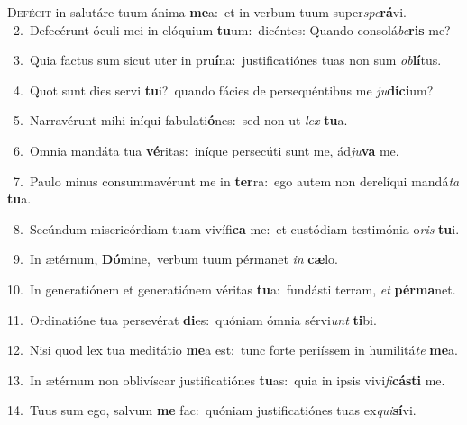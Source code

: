 \lettrine{\initial\textcolor{\initialcolor}{D}}{efécit} in salutáre tuum ánima \textbf{me}\-a:~\star et in verbum tuum super\-\textit{spe}\-\textbf{rá}vi.\\
{\numbfont\textcolor{\numbcolor}{~2.}}~Defecérunt óculi mei in elóquium \textbf{tu}\-um:~\star dicéntes: Quando consolá\-\textit{be}\-\textbf{ris} me?\par
{\numbfont\textcolor{\numbcolor}{~3.}}~Quia factus sum sicut uter in pru\-\textbf{í}\-na:~\star justificatiónes tuas non sum \textit{ob}\-\textbf{lí}tus.\par
{\numbfont\textcolor{\numbcolor}{~4.}}~Quot sunt dies servi \textbf{tu}\-i?~\star quando fácies de persequéntibus me \textit{ju}\-\textbf{dí}\textbf{ci}um?\par
{\numbfont\textcolor{\numbcolor}{~5.}}~Narravérunt mihi iníqui fabulati\-\textbf{ó}\-nes:~\star sed non ut \textit{lex} \textbf{tu}\-a.\par
{\numbfont\textcolor{\numbcolor}{~6.}}~Omnia mandáta tua \textbf{vé}\-ritas:~\star iníque persecúti sunt me, ád\-\textit{ju}\-\textbf{va} me.\par
{\numbfont\textcolor{\numbcolor}{~7.}}~Paulo minus consummavérunt me in \textbf{ter}\-ra:~\star ego autem non derelíqui mandá\textit{ta} \textbf{tu}\-a.\par
{\numbfont\textcolor{\numbcolor}{~8.}}~Secúndum misericórdiam tuam vivífi\textbf{ca} me:~\star et custódiam testimónia o\textit{ris} \textbf{tu}\-i.\par
{\numbfont\textcolor{\numbcolor}{~9.}}~In ætérnum, \textbf{Dó}\-mine,~\star verbum tuum pérmanet \textit{in} \textbf{cæ}\-lo.\par
{\numbfont\textcolor{\numbcolor}{10.}}~In generatiónem et generatiónem véritas \textbf{tu}\-a:~\star fundásti terram, \textit{et} \textbf{pér}\-\textbf{ma}net.\par
{\numbfont\textcolor{\numbcolor}{11.}}~Ordinatióne tua persevérat \textbf{di}\-es:~\star quóniam ómnia sérvi\textit{unt} \textbf{ti}\-bi.\par
{\numbfont\textcolor{\numbcolor}{12.}}~Nisi quod lex tua meditátio \textbf{me}\-a est:~\star tunc forte periíssem in humilitá\textit{te} \textbf{me}\-a.\par
{\numbfont\textcolor{\numbcolor}{13.}}~In ætérnum non oblivíscar justificatiónes \textbf{tu}\-as:~\star quia in ipsis vivi\-\textit{fi}\-\textbf{cás}\textbf{ti} me.\par
{\numbfont\textcolor{\numbcolor}{14.}}~Tuus sum ego, salvum \textbf{me} fac:~\star quóniam justificatiónes tuas ex\-\textit{qui}\-\textbf{sí}vi.\par
